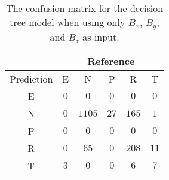 \begin{table}[!ht]
	\centering
	\begin{tabular}{|c|c|c|c|c|c|}
		\hline
		 & \multicolumn{5}{|c|}{Reference} \\ \hline
		 Prediction & E & N & P & R & T \\ \hline
		 E & $0$ & $0$ & $0$ & $0$ & $0$ \\ \hline
		 N & $0$ & $1105$ & $27$ & $165$ & $1$ \\ \hline
		 P & $0$ & $0$ & $0$ & $0$ & $0$ \\ \hline
		 R & $0$ & $65$ & $0$ & $208$ & $11$ \\ \hline
		 T & $3$ & $0$ & $0$ & $6$ & $7$ \\ \hline
	\end{tabular}
	\caption{The confusion matrix for the decision tree model when using only $B_{x}$, $B_{y}$, and $B_{z}$ as input.}
	\label{tab:cm:coord:C5.0}
\end{table}
